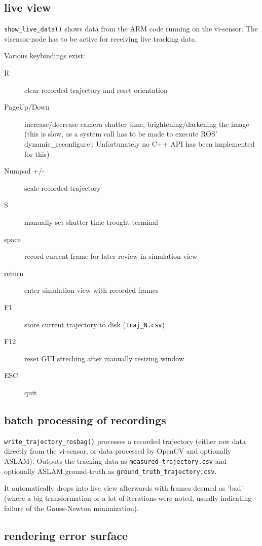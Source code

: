 \subsection{live view}

\texttt{show\_live\_data()} shows data from the ARM code running on the vi-sensor. The visensor-node has to be active for receiving live tracking data.

Various keybindings exist:

\begin{description}
    \item[R] clear recorded trajectory and reset orientation
    \item[PageUp/Down] increase/decrease camera shutter time, brightening/darkening the image (this is slow, as a system call has to be made to execute ROS' dynamic\_reconfigure'; Unfortunately no C++ API has been implemented for this)
    \item[Numpad +/-] scale recorded trajectory
    \item[S] manually set shutter time trought terminal
    \item[space] record current frame for later review in simulation view
    \item[return] enter simulation view with recorded frames
    \item[F1] store current trajectory to disk (\texttt{traj\_N.csv})
    \item[F12] reset GUI streching after manually resizing window
    \item[ESC] quit
\end{description}


\subsection{batch processing of recordings}

\texttt{write\_trajectory\_rosbag()} processes a recorded trajectory (either
raw data directly from the vi-sensor, or data processed by OpenCV and
optionally ASLAM). Outputs the tracking data as
\texttt{measured\_trajectory.csv} and optionally ASLAM ground-truth as \texttt{ground\_truth\_trajectory.csv}.

It automatically drops into live view afterwards with frames deemed as 'bad'
(where a big transformation or a lot of iterations were noted, usually
indicating failure of the Gauss-Newton minimization).


\subsection{rendering error surface}

